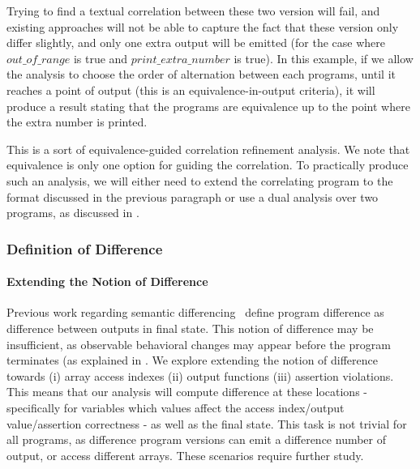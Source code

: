 

Trying to find a textual correlation between these two version will fail, and existing approaches will not be able to capture the fact that these version only differ slightly, and only one extra output will be emitted (for the case where $out\_of\_range$ is true and $print\_extra\_number$ is true). In this example, if we allow the analysis to choose the order of alternation between each programs, until it reaches a point of output (this is an equivalence-in-output criteria), it will produce a result stating that the programs are equivalence up to the point where the extra number is printed.

This is a sort of equivalence-guided correlation refinement analysis. We note that equivalence is only one option for guiding the correlation. To practically produce such an analysis, we will either need to extend the correlating program to the format discussed in the previous paragraph or use a dual analysis over two programs, as discussed in . 

\subsubsection{Definition of Difference}

\paragraph{Extending the Notion of Difference}
Previous work regarding semantic differencing~\cite{DwyerElbaumPerson08, GodlinStrichman09, EnglerRamos11, HawblitzelKawaguchiLahiriRebelo12} define program difference as difference between outputs in final state. This notion of difference may be insufficient, as observable behavioral changes may appear before the program terminates (as explained in . We explore extending the notion of difference towards (i) array access indexes (ii) output functions (iii) assertion violations. This means that our analysis will compute difference at these locations - specifically for variables which values affect the access index/output value/assertion correctness - as well as the final state. This task is not trivial for all programs, as difference program versions can emit a difference number of output, or access different arrays. These scenarios require further study.

